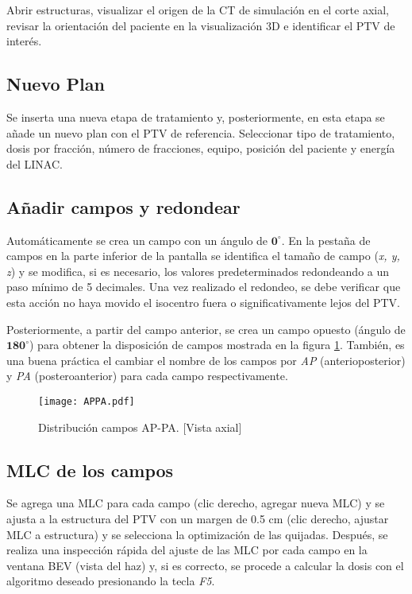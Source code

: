 \documentclass{article}
\begin{document}
Abrir estructuras, visualizar el origen de la CT de simulación en el corte axial, revisar la orientación del paciente en la visualización 3D e identificar el PTV de interés.

\subsection{Nuevo Plan}

Se inserta una nueva etapa de tratamiento y, posteriormente, en esta etapa se añade un nuevo plan con el PTV de referencia. Seleccionar tipo de tratamiento, dosis por fracción, número de fracciones, equipo, posición del paciente y energía del LINAC.

\subsection{Añadir campos y redondear}

Automáticamente se crea un campo con un ángulo de $\mathbf{0^{\circ}}$. En la pestaña de campos en la parte inferior de la pantalla se identifica el tamaño de campo (\textit{x, y, z}) y se modifica, si es necesario, los valores predeterminados redondeando a un paso mínimo de 5 decimales. Una vez realizado el redondeo, se debe verificar que esta acción no haya movido el isocentro fuera o significativamente lejos del PTV.

Posteriormente, a partir del campo anterior, se crea un campo opuesto (ángulo de $\mathbf{180^{\circ}}$) para obtener la disposición de campos mostrada en la figura \ref{APPA}. También, es una buena práctica el cambiar el nombre de los campos por \textit{AP} (anterioposterior) y \textit{PA} (posteroanterior) para cada campo respectivamente.

\begin{figure}[!ht]
    \centering
    \texttt{[image: APPA.pdf]}
    \caption{Distribución campos AP-PA. [Vista axial]}
    \label{APPA}
\end{figure}

\subsection{MLC de los campos}

Se agrega una MLC para cada campo (clic derecho, agregar nueva MLC) y se ajusta a la estructura del PTV con un margen de 0.5 cm (clic derecho, ajustar MLC a estructura) y se selecciona la optimización de las quijadas. Después, se realiza una inspección rápida del ajuste de las MLC por cada campo en la ventana BEV (vista del haz) y, si es correcto, se procede a calcular la dosis con el algoritmo deseado presionando la tecla \textit{F5}.
\end{document}
